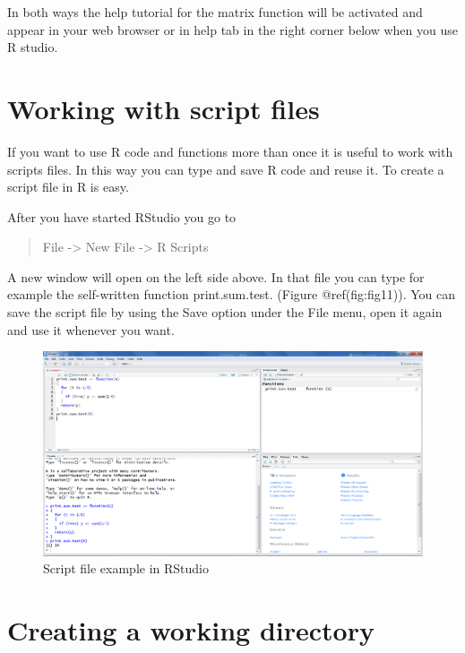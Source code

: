 \documentclass[
]{book}
\begin{document}
In both ways the help tutorial for the matrix function will be activated
and appear in your web browser or in help tab in the right corner below
when you use R studio.

\hypertarget{working-with-script-files}{%
\section{Working with script files}\label{working-with-script-files}}

If you want to use R code and functions more than once it is useful to
work with scripts files. In this way you can type and save R code and
reuse it. To create a script file in R is easy.

After you have started RStudio you go to

\begin{quote}
File -\textgreater{} New File -\textgreater{} R Scripts
\end{quote}

A new window will open on the left side above. In that file you can type
for example the self-written function print.sum.test. (Figure
@ref(fig:fig11)). You can save the script file by using the Save option
under the File menu, open it again and use it whenever you want.

\begin{figure}

{\centering \includegraphics[width=0.95\linewidth]{images/fig1.11} 

}

\caption{Script file example in RStudio}\label{fig:fig11}
\end{figure}

\hypertarget{creating-a-working-directory}{%
\section{Creating a working
directory}\label{creating-a-working-directory}}
\end{document}
